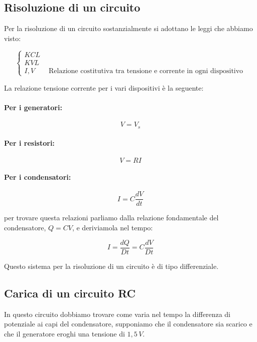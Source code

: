 \subsection{Risoluzione di un circuito}
\label{RisoluzioneCircuito}
Per la risoluzione di un circuito sostanzialmente si adottano le leggi che abbiamo visto:

$$
\begin{cases}
    KCL\\
    KVL\\
    I, V \qquad \text{Relazione costitutiva tra tensione e corrente in ogni dispositivo}
\end{cases}
$$

La relazione tensione corrente per i vari dispositivi è la seguente:

\paragraph{Per i generatori: }
\begin{equation}
    V = V_s
\end{equation}

\paragraph{Per i resistori: }
\begin{equation}
    V = R I
\end{equation}

\paragraph{Per i condensatori: }
\begin{equation}
    I = C \frac{dV}{dt}
\end{equation}

per trovare questa relazioni parliamo dalla relazione fondamentale del condensatore, $Q = CV$, e deriviamola nel tempo:

\begin{equation*}
    I = \frac{dQ}{Dt} = C\frac{dV}{Dt}
\end{equation*}

Questo sistema per la risoluzione di un circuito è di tipo differenziale.   

\subsection{Carica di un circuito RC}
In questo circuito dobbiamo trovare come varia nel tempo la differenza di potenziale ai capi del condensatore, supponiamo che il condensatore sia scarico e che il generatore eroghi una tensione di $1,5\,V$.
